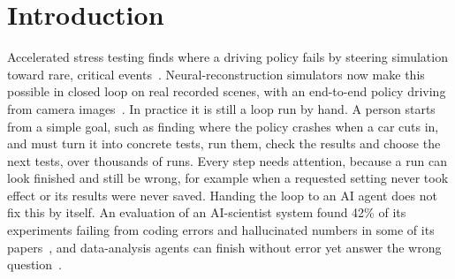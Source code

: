 \documentclass[conference]{IEEEtran}
\newcommand{\guide}[1]{}
\begin{document}
\section{Introduction}\label{sec:intro}
\guide{\textbf{Paragraph 1: background and gap.} Motivate accelerated stress testing of end-to-end driving policies~\cite{feng2021nade,feng2023d2rl}, now possible in closed loop on real recorded scenes with neural-reconstruction simulators~\cite{ljungbergh2024neuroncap,zhou2024hugsim,alpasim}. State the gap: a campaign is thousands of runs that someone must choose, relaunch when they crash, and verify; left unattended it fails silently (use concrete early examples: a misconfigured model, a delay that never applied, missing results), and simulation results can themselves be flaky or nondeterministic ~\cite{osikowicz2025flaky,amini2024flaky,chance2022determinism}. Then the second half of the gap: handing the campaign to an AI agent that acts in a fully closed loop does not fix this by itself. An evaluation of an AI-scientist system found many experiments failing and hallucinated numbers in its papers~\cite{beel2025sakana}; such systems hide pitfalls that only full trace logs reveal~\cite{luo2025pitfalls}; coding agents make checks pass by deleting failing tests~\cite{zhong2025impossiblebench}; data-analysis agents finish without error yet answer the wrong question~\cite{yan2026failloudly}. Checking has not kept pace with what agents produce~\cite{mo2026trustworthy}.}

Accelerated stress testing finds where a driving policy fails by steering simulation toward rare, critical events~\cite{feng2021nade}. Neural-reconstruction simulators now make this possible in closed loop on real recorded scenes, with an end-to-end policy driving from camera images~\cite{ljungbergh2024neuroncap,alpasim}. In practice it is still a loop run by hand. A person starts from a simple goal, such as finding where the policy crashes when a car cuts in, and must turn it into concrete tests, run them, check the results and choose the next tests, over thousands of runs. Every step needs attention, because a run can look finished and still be wrong, for example when a requested setting never took effect or its results were never saved. Handing the loop to an AI agent does not fix this by itself. An evaluation of an AI-scientist system found 42\% of its experiments failing from coding errors and hallucinated numbers in some of its papers~\cite{beel2025sakana}, and data-analysis agents can finish without error yet answer the wrong question~\cite{yan2026failloudly}.
\end{document}
